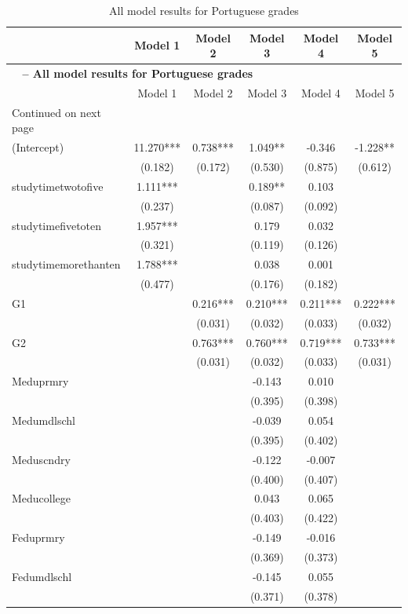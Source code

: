 \documentclass[12pt,english]{article}
\begin{document}
\begin{longtable}[c]{lccccc}
\caption{All model results for Portuguese grades} \label{tab:7} \\
\hline 
 & Model 1 & Model 2 & Model 3 & Model 4 & Model 5\\
\endfirsthead
\multicolumn{5}{4}{{\bfseries \tablename\ \thetable{} -- All model results for Portuguese grades}} \\
\hline 
  & Model 1 & Model 2 & Model 3 & Model 4 & Model 5\\
\endhead
\hline {{Continued on next page}} \\ \hline
\endfoot
\hline \hline
\endlastfoot
(Intercept) & 11.270*** & 0.738*** & 1.049** & -0.346 & -1.228**\\
 & (0.182) & (0.172) & (0.530) & (0.875) & (0.612)\\
studytimetwotofive & 1.111*** &  & 0.189** & 0.103 & \\
 & (0.237) &  & (0.087) & (0.092) & \\
studytimefivetoten & 1.957*** &  & 0.179 & 0.032 & \\
 & (0.321) &  & (0.119) & (0.126) & \\
studytimemorethanten & 1.788*** &  & 0.038 & 0.001 & \\
 & (0.477) &  & (0.176) & (0.182) & \\
G1 &  & 0.216*** & 0.210*** & 0.211*** & 0.222***\\
 &  & (0.031) & (0.032) & (0.033) & (0.032)\\
G2 &  & 0.763*** & 0.760*** & 0.719*** & 0.733***\\
 &  & (0.031) & (0.032) & (0.033) & (0.031)\\
Meduprmry &  &  & -0.143 & 0.010 & \\
 &  &  & (0.395) & (0.398) & \\
Medumdlschl &  &  & -0.039 & 0.054 & \\
 &  &  & (0.395) & (0.402) & \\
Meduscndry &  &  & -0.122 & -0.007 & \\
 &  &  & (0.400) & (0.407) & \\
Meducollege &  &  & 0.043 & 0.065 & \\
 &  &  & (0.403) & (0.422) & \\
Feduprmry &  &  & -0.149 & -0.016 & \\
 &  &  & (0.369) & (0.373) & \\
Fedumdlschl &  &  & -0.145 & 0.055 & \\
 &  &  & (0.371) & (0.378) & \\

\end{longtable}
\end{document}

